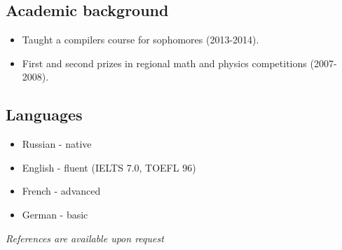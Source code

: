 \documentclass[letterpaper]{resume}
\begin{document}
\subsection{Academic background}
\begin{itemize}
  \item Taught a compilers course for sophomores (2013-2014).
  \item First and second prizes in regional math and physics competitions (2007-2008).
\end{itemize}

\subsection{Languages}
\begin{itemize}
    \item Russian - native
    \item English - fluent (IELTS 7.0, TOEFL 96)
    \item French - advanced
    \item German - basic
\end{itemize}


\emph{References are available upon request} 
\end{document}
